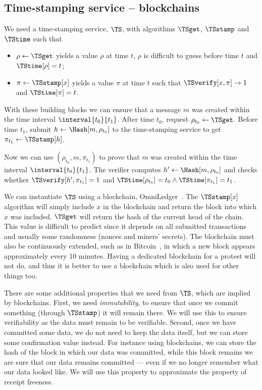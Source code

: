 \subsection{Time-stamping service -- blockchains}%
\label{StorageProperties}


We need a time-stamping service, \(\TS\), with algorithms \(\TSget\), 
\(\TSstamp\) and \(\TStime\) such that
\begin{itemize}
  \item \(\rho \gets \TSget\) yields a value \(\rho\) at time \(t\), \(\rho\) is difficult to guess before time \(t\) and \(\TStime[\rho] = t\);
  \item \(\pi\gets \TSstamp[x]\) yields a value \(\pi\) at time \(t\) such that \(\TSverify[x, \pi]\to 1\) and \(\TStime[\pi] = t\).
\end{itemize}

With these building blocks we can ensure that a message \(m\) was created within the time interval \(\interval{t_0}{t_1}\).
After time \(t_0\), request \(\rho_{t_0}\gets \TSget\).
Before time \(t_1\), submit \(h\gets \Hash[m, \rho_{t_0}]\) to the time-stamping service to get \(\pi_{t_1}\gets \TSstamp[h]\).

Now we can use \((\rho_{t_0}, m, \pi_{t_1})\) to prove that \(m\) was created within the time interval \(\interval{t_0}{t_1}\).
The verifier computes \(h'\gets \Hash[m, \rho_{t_0}]\) and checks whether \(\TSverify[h', \pi_{t_1}] = 1\) and \(\TStime[\rho_{t_0}] = t_0\land \TStime[\pi_{t_1}] = t_1\).

We can instantiate \(\TS\) using a blockchain, \eg OmniLedger~\cite{OmniLedger}.
The \(\TSstamp[x]\) algorithm will simply include \(x\) in the blockchain and return the block into which \(x\) was included.
\(\TSget\) will return the hash of the current head of the chain.
This value is difficult to predict since it depends on all submitted transactions and usually some randomness (\eg nonces and miners' secrets).
The blockchain must also be continuously extended, such as in Bitcoin~\cite{Bitcoin}, in which a new block appears approximately every 10 minutes.
Having a dedicated blockchain for a protest will not do, and thus it is better to use a blockchain which is also used for other things too.

There are some additional properties that we need from \(\TS\), which are implied by blockchains.
First, we need \emph{immutability}, to ensure that once we commit something (through \(\TSstamp\)) it will remain there.
We will use this to ensure verifiability as the data must remain to be verifiable.
Second, once we have committed some data, we do not need to keep the data itself, but we can store some confirmation value instead.
For instance using blockchains, we can store the hash of the block in which our data was committed, while this block remains we are sure that our data remains committed --- even if we no longer remember what our data looked like.
We will use this property to approximate the property of receipt freeness.
